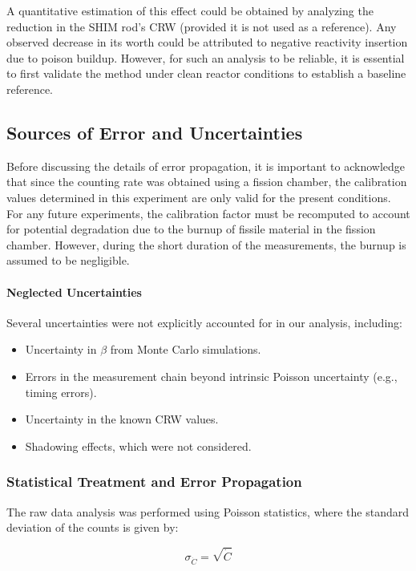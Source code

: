 A quantitative estimation of this effect could be obtained by analyzing the reduction in the SHIM rod's CRW (provided it is not used as a reference). Any observed decrease in its worth could be attributed to negative reactivity insertion due to poison buildup. However, for such an analysis to be reliable, it is essential to first validate the method under clean reactor conditions to establish a baseline reference.

\subsection{Sources of Error and Uncertainties}

Before discussing the details of error propagation, it is important to acknowledge that since the counting rate was obtained using a fission chamber, the calibration values determined in this experiment are only valid for the present conditions. For any future experiments, the calibration factor must be recomputed to account for potential degradation due to the burnup of fissile material in the fission chamber. However, during the short duration of the measurements, the burnup is assumed to be negligible.

\paragraph{Neglected Uncertainties} Several uncertainties were not explicitly accounted for in our analysis, including:

\begin{itemize}
    \item Uncertainty in $\beta$ from Monte Carlo simulations.
    \item Errors in the measurement chain beyond intrinsic Poisson uncertainty (e.g., timing errors).
    \item Uncertainty in the known CRW values.
    \item Shadowing effects, which were not considered.
\end{itemize}

\subsubsection{Statistical Treatment and Error Propagation}

The raw data analysis was performed using Poisson statistics, where the standard deviation of the counts is given by:

\begin{equation}
\sigma_{\dot{C}} = \sqrt{\dot{C}}
\end{equation}

